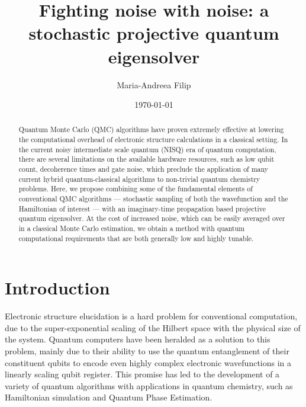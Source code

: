 \documentclass[%
 reprint,
 amsmath,amssymb,
 aps,
]{revtex4-2}
\begin{document}
\title{Fighting noise with noise: a stochastic projective quantum eigensolver}
\author{Maria-Andreea Filip}  

% 
% 
\date{\today}%

\begin{abstract}
Quantum Monte Carlo (QMC) algorithms have proven extremely effective at lowering the computational overhead of electronic structure calculations in a classical setting. In the current noisy intermediate scale quantum (NISQ) era of quantum computation, there are several limitations on the available hardware resources, such as low qubit count, decoherence times and gate noise, which preclude the application of many current hybrid quantum-classical algorithms to non-trivial quantum chemistry problems. Here, we propose combining some of the fundamental elements of conventional QMC algorithms --- stochastic sampling of both the wavefunction and the Hamiltonian of interest --- with an imaginary-time propagation based projective quantum eigensolver. At the cost of increased noise, which can be easily averaged over in a classical Monte Carlo estimation, we obtain a method with quantum computational requirements that are both generally low and highly tunable.
\end{abstract}
\maketitle

\section{Introduction}
Electronic structure elucidation is a hard problem for conventional computation, due to the super-exponential scaling of the Hilbert space with the physical size of the system. Quantum computers have been heralded as a solution to this problem,\cite{Feynman1982, Aspuru-Guzik2005} mainly due to their ability to use the quantum entanglement of their constituent qubits to encode even highly complex electronic wavefunctions in a linearly scaling qubit register. This promise has led to the development of a variety of quantum algorithms with applications in quantum chemistry, such as Hamiltonian simulation\cite{Berry2007, Berry2015, Low2017, Childs2018} and Quantum Phase Estimation.\cite{Abrams1997, Abrams1999}
\end{document}
